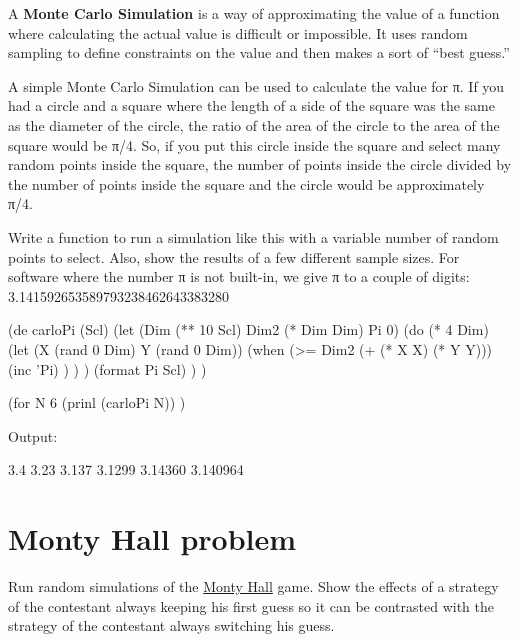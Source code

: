 A \textbf{Monte Carlo Simulation} is a way of approximating the value of
a function where calculating the actual value is difficult or
impossible. It uses random sampling to define constraints on the value
and then makes a sort of ``best guess.''

A simple Monte Carlo Simulation can be used to calculate the value for
π. If you had a circle and a square where the length of a side of the
square was the same as the diameter of the circle, the ratio of the area
of the circle to the area of the square would be π/4. So, if you put
this circle inside the square and select many random points inside the
square, the number of points inside the circle divided by the number of
points inside the square and the circle would be approximately π/4.

Write a function to run a simulation like this with a variable number of
random points to select. Also, show the results of a few different
sample sizes. For software where the number π is not built-in, we give π
to a couple of digits: 3.141592653589793238462643383280


\begin{wideverbatim}

(de carloPi (Scl)
   (let (Dim (** 10 Scl)  Dim2 (* Dim Dim)  Pi 0)
      (do (* 4 Dim)
         (let (X (rand 0 Dim)  Y (rand 0 Dim))
            (when (>= Dim2 (+ (* X X) (* Y Y)))
               (inc 'Pi) ) ) )
      (format Pi Scl) ) )

(for N 6
   (prinl (carloPi N)) )

Output:

3.4
3.23
3.137
3.1299
3.14360
3.140964

\end{wideverbatim}

\pagebreak{}
\section*{Monty Hall problem}

Run random simulations of the
\href{http://en.wikipedia.org/wiki/Monty\_Hall\_problem}{Monty Hall}
game. Show the effects of a strategy of the contestant always keeping
his first guess so it can be contrasted with the strategy of the
contestant always switching his guess.

